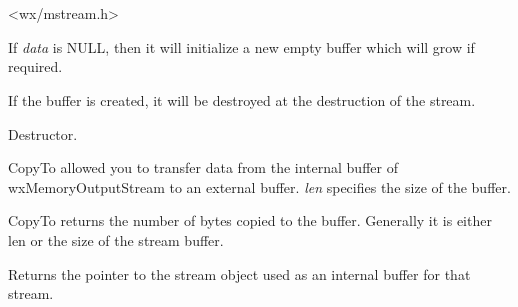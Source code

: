 \section{}\label{wxmemoutputstream}




<wx/mstream.h>




\label{wxmemoryoutputstreamctor}


If {\it data} is NULL, then it will initialize a new empty buffer which will
grow if required.


If the buffer is created, it will be destroyed at the destruction of the
stream.

\label{wxmemoryoutputstreamdtor}


Destructor.

\label{wxmemoryoutputstreamcopyto}


CopyTo allowed you to transfer data from the internal buffer of
wxMemoryOutputStream to an external buffer. {\it len} specifies the size of
the buffer.


CopyTo returns the number of bytes copied to the buffer. Generally it is either
len or the size of the stream buffer.

\label{wxmemoryoutputstreamgetostrmbuf}


Returns the pointer to the stream object used as an internal buffer
for that stream.

